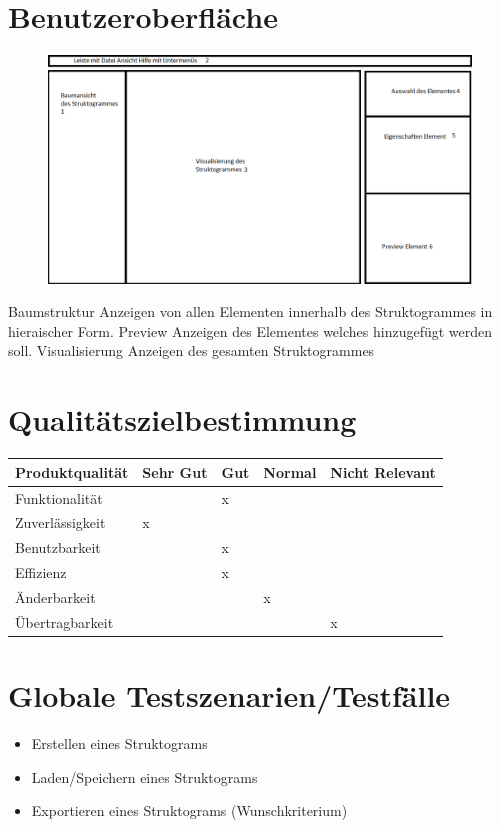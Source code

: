 \documentclass[a4paper,10pt]{report}
\begin{document}
\section{Benutzeroberfläche}
\begin{figure}[h!]
  \centering
    \includegraphics[width=1.3\textwidth]{gui-skizze.png}
\end{figure}
Baumstruktur Anzeigen von allen Elementen innerhalb des Struktogrammes in hieraischer Form.
Preview Anzeigen des Elementes welches hinzugefügt werden soll.
Visualisierung Anzeigen des gesamten Struktogrammes

\section{Qualitätszielbestimmung}

\begin{center}
  \begin{tabular}{| l | l | l | l | l |}
    \hline
   	 Produktqualität & Sehr Gut & Gut  & Normal & Nicht Relevant \\ \hline
    	 Funktionalität &   &  x &  & \\ \hline
 	 Zuverlässigkeit & x  &   &  & \\ \hline
 	Benutzbarkeit &   &  x &  & \\ \hline
      	 Effizienz &   &  x &  & \\ \hline
      	 Änderbarkeit &   &  &  x & \\ \hline
      	Übertragbarkeit &   &   &  & x \\ \hline
  \end{tabular}
\end{center}

\section{Globale Testszenarien/Testfälle}
\begin{itemize}
\item  Erstellen eines Struktograms
\item  Laden/Speichern eines Struktograms
\item  Exportieren eines Struktograms (Wunschkriterium)
\end{itemize}
\end{document}
